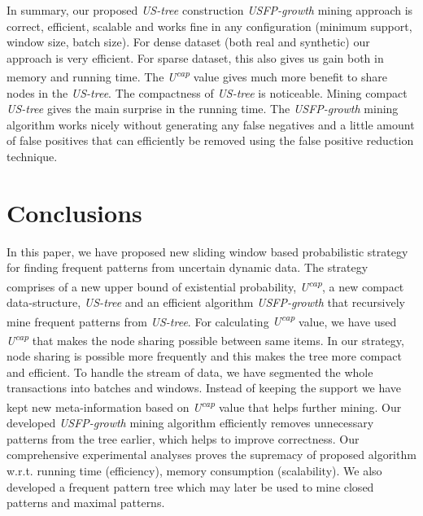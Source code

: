 \documentclass[conference]{IEEEtran}
\begin{document}
In summary, our proposed \emph{US-tree} construction \emph{USFP-growth} mining approach is correct, efficient, scalable and works fine in any configuration (minimum support, window size, batch size). For dense dataset (both real and synthetic) our approach is very efficient. For sparse dataset, this also gives us gain both in memory and running time. The \emph{U\textsuperscript{cap}} value gives much more benefit to share nodes in the \emph{US-tree}. The compactness of \emph{US-tree} is noticeable. Mining compact \emph{US-tree} gives the main surprise in the running time. The \emph{USFP-growth} mining algorithm works nicely without generating any false negatives and a little amount of false positives that can efficiently be removed using the false positive reduction technique.

\section{Conclusions}\label{Conclusion}
In this paper, we have proposed new sliding window based probabilistic strategy for finding frequent patterns from uncertain dynamic data. The strategy comprises of a new upper bound of existential probability, \emph{U\textsuperscript{cap}}, a new compact data-structure, \emph{US-tree} and an efficient algorithm \emph{USFP-growth} that recursively mine frequent patterns from \emph{US-tree}. For calculating \emph{U\textsuperscript{cap}} value, we have used \emph{U\textsuperscript{cap}} that makes the node sharing possible between same items. In our strategy, node sharing is possible more frequently and this makes the tree more compact and efficient. To handle the stream of data, we have segmented the whole transactions into batches and windows. Instead of keeping the support we have kept new meta-information based on \emph{U\textsuperscript{cap}} value that helps further mining. Our developed \emph{USFP-growth} mining algorithm efficiently removes unnecessary patterns from the tree earlier, which helps to improve correctness. Our comprehensive experimental analyses proves the supremacy of proposed algorithm w.r.t. running time (efficiency), memory consumption (scalability). We also developed a frequent pattern tree which may later be used to mine closed patterns and maximal patterns.


%


\end{document}
